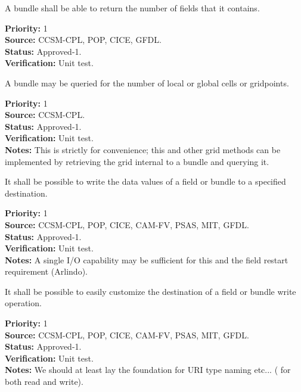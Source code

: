 A bundle shall be able to return the number of fields that it contains.
\begin{reqlist}
{\bf Priority:} 1\\
{\bf Source:} CCSM-CPL, POP, CICE, GFDL. \\
{\bf Status:} Approved-1. \\
{\bf Verification:} Unit test. 
\end{reqlist}

A bundle may be queried for the number of local or global cells
or gridpoints.
\begin{reqlist}
{\bf Priority:} 1\\
{\bf Source:} CCSM-CPL. \\
{\bf Status:} Approved-1. \\
{\bf Verification:} Unit test. \\
{\bf Notes:} This is strictly for convenience; this and other grid
methods can be implemented by retrieving the grid internal to a 
bundle and querying it.
\end{reqlist}


It shall be possible to write the data values of a field or bundle to 
a specified destination. 
\begin{reqlist}
{\bf Priority:} 1\\
{\bf Source:} CCSM-CPL, POP, CICE, CAM-FV, PSAS, MIT, GFDL. \\
{\bf Status:} Approved-1. \\
{\bf Verification:} Unit test. \\
{\bf Notes: } A single I/O capability may be sufficient for this and the field
restart requirement (Arlindo).
\end{reqlist}

It shall be possible to easily customize the destination of 
a field or bundle write operation.
\begin{reqlist}
{\bf Priority:} 1\\
{\bf Source:} CCSM-CPL, POP, CICE, CAM-FV, PSAS, MIT, GFDL.\\
{\bf Status:} Approved-1. \\
{\bf Verification:} Unit test. \\
{\bf Notes:} 
We should at least lay the foundation for URI type naming etc... ( for both
read and write).
\\
\end{reqlist}

